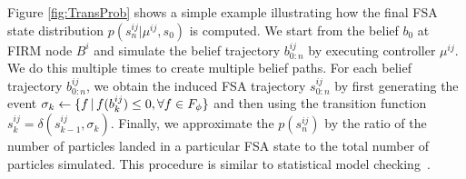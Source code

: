 \documentclass[letterpaper]{article} %
\newcommand{\sofie}[1]{{\color{purple} [Sofie] #1}}
\begin{document}
Figure \ref{fig:TransProb} shows a simple example illustrating how the final FSA state distribution $p(s^{ij}_n|\mu^{ij},s_0)$ is computed.
We start from the belief $b_0$ at FIRM node $B^i$ and simulate the belief trajectory $b^{ij}_{0:n}$ by executing controller $\mu^{ij}$. We do this multiple times to create multiple belief paths. For each belief trajectory $b^{ij}_{0:n}$, we obtain the induced FSA trajectory $s^{ij}_{0:n}$ by first generating the event $\sigma_k \leftarrow \{ f \,|\, f(b^{ij}_k) \leq 0, \forall f \in F_\phi \}$ and then using the transition function $s^{ij}_{k} = \delta(s^{ij}_{k-1},\sigma_k)$. Finally, we approximate the $p(s^{ij}_n)$ by the ratio of the number of particles landed in a particular FSA state to the total number of particles simulated.
This procedure is similar to statistical model checking~\cite{Legay2010}.







\end{document}
